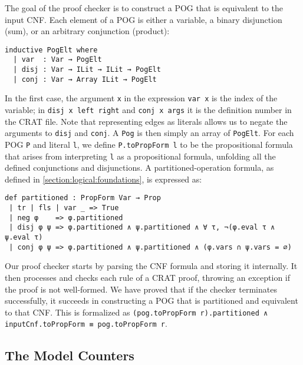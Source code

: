The goal of the proof checker is to construct a POG that is equivalent to the input CNF.
Each element of a POG  is either a variable, a binary disjunction (sum),
or an arbitrary conjunction (product):
\begin{lstlisting}
inductive PogElt where
  | var  : Var → PogElt
  | disj : Var → ILit → ILit → PogElt
  | conj : Var → Array ILit → PogElt
\end{lstlisting}
In the first case, the argument \lstinline{x} in the expression
\lstinline{var x} is the index
of the variable; in \lstinline{disj x left right} and \lstinline{conj x args}
it is the definition number in the CRAT file. Note that representing edges as literals allows us to negate the arguments to \lstinline{disj} and \lstinline{conj}.
A \lstinline{Pog} is then simply an array of \lstinline{PogElt}.
For each POG \lstinline{P} and literal \lstinline{l}, we define
\lstinline{P.toPropForm l} to be the
propositional formula that arises from interpreting \lstinline{l} as a propositional
formula, unfolding all the defined conjunctions and disjunctions.
A partitioned-operation formula, as defined in \cref{section:logical:foundations}, is expressed as:
\begin{lstlisting}
def partitioned : PropForm Var → Prop
 | tr | fls | var _ => True
 | neg φ    => φ.partitioned
 | disj φ ψ => φ.partitioned ∧ ψ.partitioned ∧ ∀ τ, ¬(φ.eval τ ∧ ψ.eval τ)
 | conj φ ψ => φ.partitioned ∧ ψ.partitioned ∧ (φ.vars ∩ ψ.vars = ∅)
\end{lstlisting}

Our proof checker starts by parsing the CNF formula and storing it internally.
It then processes and checks each rule of a CRAT proof, throwing an exception if
the proof is not well-formed. We have proved that if the checker terminates successfully,
it succeeds in constructing a POG that is partitioned and equivalent to that CNF. This is formalized as \lstinline{(pog.toPropForm r).partitioned ∧ inputCnf.toPropForm ≡ pog.toPropForm r}.

\subsection{The Model Counters}
\label{subsection:counting}

